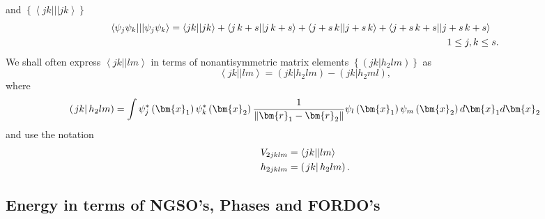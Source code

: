 \documentclass{preprint}
\begin{document}
and $\left\{ \left\langle jk|||jk\right\rangle \right\} $
\begin{align}
\left\langle \psi _{j}\psi _{k}|||\psi _{j}\psi _{k}\right\rangle &
=\left\langle jk||jk\right\rangle +\left\langle j\,k+s||j\,k+s\right\rangle
+\left\langle j+s\,k||j+s\,k\right\rangle +\left\langle
j+s\,k+s||j+s\,k+s\right\rangle  \notag \\
& \left. {}\right. \qquad \qquad \qquad \qquad \qquad \qquad \qquad \qquad
\qquad \qquad \qquad \qquad \qquad \qquad 1\leq j,k\leq s.
\end{align}%
We shall often express $\left\langle jk||lm\right\rangle $ in terms of
nonantisymmetric matrix elements $\left\{ \left( \left. jk\right\vert
h_{2}lm\right) \right\} $ as
\begin{equation}
\left\langle jk||lm\right\rangle =\left( \left. jk\right\vert h_{2}lm\right)
-\left( \left. jk\right\vert h_{2}ml\right) ,
\end{equation}%
where
\begin{equation}
\left( \left. jk\right\vert h_{2}lm\right) =\int \psi _{j}^{\ast }\left( %
\bm{x}_{1}\right) \psi _{k}^{\ast }\left( \bm{x}_{2}\right) \frac{1}{%
\left\Vert \bm{r}_{1}-\bm{r}_{2}\right\Vert }\psi _{l}\left( \bm{x}%
_{1}\right) \psi _{m}\left( \bm{x}_{2}\right) d\bm{x}_{1}d\bm{x}_{2}
\end{equation}%
and use the notation
\begin{align}
V_{2jklm}& =\left\langle jk||lm\right\rangle  \notag \\
h_{2jklm}& =\left( \left. jk\right\vert h_{2}lm\right) .
\end{align}

\subsection{Energy in terms of NGSO's, Phases and FORDO's\label{EnON_NGSO}}
\end{document}
